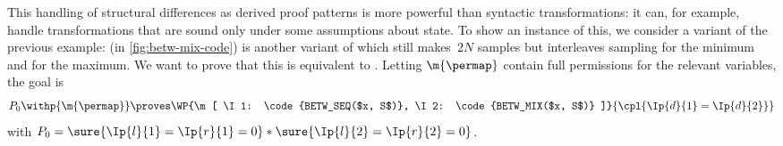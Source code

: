 \documentclass[acmsmall,nonacm,screen,appendix]{acmart}
\begin{document}
\begingroup \newcommand{\tBet}[1]{t_{\p{M}}^{#1}}



This handling of structural differences as derived proof patterns
is more powerful than syntactic transformations:
it can, for example, handle transformations that are sound only under some
assumptions about state.
To show an instance of this,
we consider a variant of the previous example:
 (in \cref{fig:betw-mix-code})
is another variant of 
which still makes~$2N$ samples but interleaves sampling
for the minimum and for the maximum.
We want to prove that this is equivalent to .
Letting $\m{\permap}$ contain full permissions for the relevant variables,
the goal is \[
  P_0\withp{\m{\permap}}
  \proves
  \WP {\m[
    \I1: \code{BETW_SEQ($x, S$)},
    \I2: \code{BETW_MIX($x, S$)}
  ]} {
    \cpl{\Ip{d}{1} = \Ip{d}{2}}
  }
\]
with $P_0 = \sure{{\Ip{l}{1}=\Ip{r}{1}=0}}*\sure{{\Ip{l}{2}=\Ip{r}{2}=0}}$.
\end{document}
